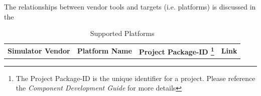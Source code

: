 The relationships between vendor tools and targets (i.e. platforms) is discussed in the 
	\begin{center}
		\renewcommand*\footnoterule{} %
		\renewcommand{\thempfootnote}{\arabic{mpfootnote}} %
		\begin{minipage}{1.063\textwidth}
		\begin{table}[H]
		\caption {Supported Platforms}\label{tab:plats}
		\label{table:hdlworkers} %
			\begin{tabularx}{\textwidth}{|l|l|l|p{5cm}|}
			\hline
			\rowcolor{blue}
			\textbf{Simulator Vendor} & \textbf{Platform Name} & \textbf{Project Package-ID \footnote{The Project Package-ID is the unique identifier for a project. Please reference the \textit{Component Development Guide} for more details}} & \textbf{Link}\\


\end{tabularx}
\end{table}
\end{minipage}
\end{center}
